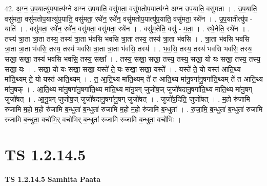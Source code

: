 \documentclass[17pt]{extarticle}
\begin{document}
42. अ॒ग्न॒ उ॒प॒यात्यु॑प॒यात्य॑ग्ने अग्न उप॒याति॒ वसु॑मता॒ वसु॑मतोप॒यात्य॑ग्ने अग्न उप॒याति॒ वसु॑मता । . उ॒प॒याति॒ वसु॑मता॒ वसु॑मतोप॒यात्यु॑प॒याति॒ वसु॑मता॒ रथे॑न॒ रथे॑न॒ वसु॑मतोप॒यात्यु॑प॒याति॒ वसु॑मता॒ रथे॑न । . उ॒प॒यातीत्यु॑प - याति॑ । . वसु॑मता॒ रथे॑न॒ रथे॑न॒ वसु॑मता॒ वसु॑मता॒ रथे॑न । . वसु॑म॒तेति॒ वसु॑ - म॒ता॒ । . रथे॒नेति॒ रथे॑न । . तस्य॑ त्रा॒ता त्रा॒ता तस्य॒ तस्य॑ त्रा॒ता भ॑वसि भवसि त्रा॒ता तस्य॒ तस्य॑ त्रा॒ता भ॑वसि । . त्रा॒ता भ॑वसि भवसि त्रा॒ता त्रा॒ता भ॑वसि॒ तस्य॒ तस्य॑ भवसि त्रा॒ता त्रा॒ता भ॑वसि॒ तस्य॑ । . भ॒व॒सि॒ तस्य॒ तस्य॑ भवसि भवसि॒ तस्य॒ सखा॒ सखा॒ तस्य॑ भवसि भवसि॒ तस्य॒ सखा᳚ । . तस्य॒ सखा॒ सखा॒ तस्य॒ तस्य॒ सखा॒ यो यः सखा॒ तस्य॒ तस्य॒ सखा॒ यः । . सखा॒ यो यः सखा॒ सखा॒ यस्ते॑ ते॒ यः सखा॒ सखा॒ यस्ते᳚ । . यस्ते॑ ते॒ यो यस्त॑ आति॒थ्य मा॑ति॒थ्यम् ते॒ यो यस्त॑ आति॒थ्यम् । . त॒ आ॒ति॒थ्य मा॑ति॒थ्यम् ते॑ त आति॒थ्य मा॑नु॒षगा॑नु॒षगा॑ति॒थ्यम् ते॑ त आति॒थ्य मा॑नु॒षक् । . आ॒ति॒थ्य मा॑नु॒षगा॑नु॒षगा॑ति॒थ्य मा॑ति॒थ्य मा॑नु॒षग् जुजो॑ष॒ज् जुजो॑षदानु॒षगा॑ति॒थ्य मा॑ति॒थ्य मा॑नु॒षग् जुजो॑षत् । . आ॒नु॒षग् जुजो॑ष॒ज् जुजो॑षदानु॒षगा॑नु॒षग् जुजो॑षत् । . जुजो॑ष॒दिति॒ जुजो॑षत् । . म॒हो रु॑जामि रुजामि म॒हो म॒हो रु॑जामि ब॒न्धुता॑ ब॒न्धुता॑ रुजामि म॒हो म॒हो रु॑जामि ब॒न्धुता᳚ । . रु॒जा॒मि॒ ब॒न्धुता॑ ब॒न्धुता॑ रुजामि रुजामि ब॒न्धुता॒ वचो॑भि॒र् वचो॑भिर् ब॒न्धुता॑ रुजामि रुजामि ब॒न्धुता॒ वचो॑भिः । \newline
\pagebreak
{}
\section*{ TS 1.2.14.5 }

\textbf{TS 1.2.14.5 } \newline
\textbf{Samhita Paata} \newline
\end{document}
